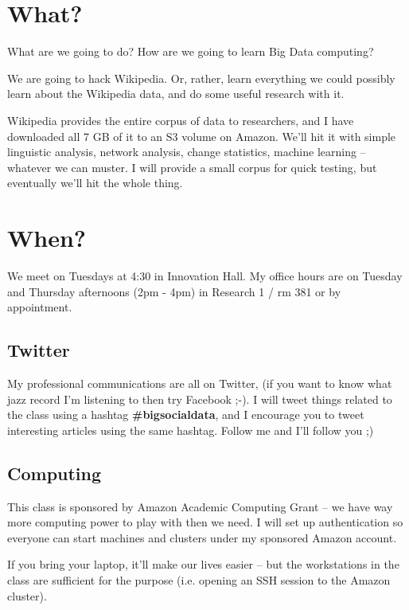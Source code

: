 \documentclass[12pt]{article}
\begin{document}
\section{What?}

What are we going to do? How are we going to learn Big Data computing?

We are going to hack Wikipedia. Or, rather, learn everything we could possibly learn about the Wikipedia data, and do some useful research with it. 

Wikipedia provides the entire corpus of data to researchers, and I have downloaded all 7 GB of it to an S3 volume on Amazon. We'll hit it with simple linguistic analysis, network analysis, change statistics, machine learning -- whatever we can muster.  I will provide a small corpus for quick testing, but eventually we'll hit the whole thing.

\section{When?}

We meet on Tuesdays at 4:30 in Innovation Hall. My office hours are on Tuesday and Thursday afternoons (2pm - 4pm) in Research 1 / rm 381 or by appointment.

\subsection{Twitter}

My professional communications are all on Twitter, {\bf {}} (if you want to know what jazz record I'm listening to then try Facebook ;-). I will tweet things related to the class using a hashtag {\bf \#bigsocialdata}, and I encourage you to tweet interesting articles using the same hashtag. Follow me and I'll follow you ;)

\subsection{Computing}

This class is sponsored by Amazon Academic Computing Grant -- we have way more computing power to play with then we need. I will set up authentication so everyone can start machines and clusters under my sponsored Amazon account. 

If you bring your laptop, it'll make our lives easier -- but the workstations in the class are sufficient for the purpose (i.e. opening an SSH session to the Amazon cluster).
\end{document}
